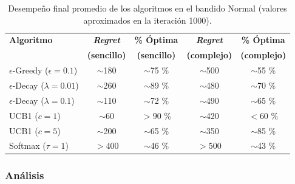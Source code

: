 \begin{table}[H]
\centering
\renewcommand{\arraystretch}{1.5} %
\setlength{\tabcolsep}{3pt}      %

\begin{scriptsize} %
\begin{tabular}{l c c c c}
\hline
\textbf{Algoritmo} & \textbf{\textit{Regret}} & \textbf{\% Óptima} & \textbf{\textit{Regret}} & \textbf{\% Óptima} \\ 
 & \textbf{(sencillo)} & \textbf{(sencillo)} & \textbf{(complejo)} & \textbf{(complejo)} \\ 
\hline
$\epsilon$-Greedy ($\epsilon=0.1$) & $\sim$180 & $\sim$75 \% & $\sim$500 & $\sim$55 \% \\ 
\hline
$\epsilon$-Decay ($\lambda=0.01$) & $\sim$260 & $\sim$89 \% & $\sim$480 & $\sim$70 \% \\ 
\hline
$\epsilon$-Decay ($\lambda=0.1$) & $\sim$110 & $\sim$72 \% & $\sim$490 & $\sim$65 \% \\ 
\hline
UCB1 ($c=1$) & $\sim$60 & $>90$ \% & $\sim$420 & $<60$ \% \\ 
\hline
UCB1 ($c=5$) & $\sim$200 & $\sim$65 \% & $\sim$350 & $\sim$85 \% \\ 
\hline
Softmax ($\tau=1$) & $>400$ & $\sim$46 \% & $>500$ & $\sim$43 \% \\ 
\hline
\end{tabular}
\end{scriptsize}

\caption{Desempeño final promedio de los algoritmos en el bandido Normal (valores aproximados en la iteración 1000).}
\vspace{-20pt}
\end{table}


\subsubsection*{Análisis}

